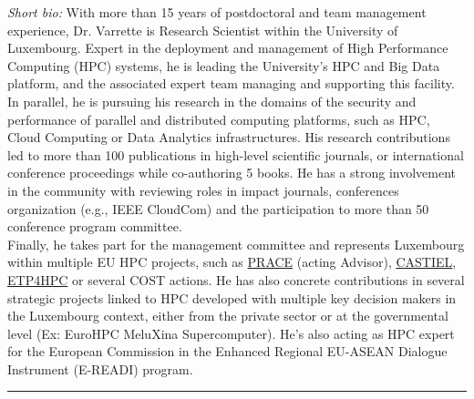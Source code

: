 \documentclass{cv}
\begin{document}
\emph{Short bio:}
With more than 15 years of postdoctoral and team management experience, Dr. Varrette is Research Scientist within the University of Luxembourg.
Expert in the deployment and management of High Performance Computing (HPC) systems, he is leading the University’s HPC and Big Data platform, and the associated expert team managing and supporting this facility.\\
In parallel, he is pursuing his research in the domains of the security and performance of parallel and distributed computing platforms, such as HPC, Cloud Computing or Data Analytics infrastructures.
His research contributions led to more than 100 publications in high-level scientific journals, or international conference proceedings while co-authoring 5 books. He has a strong involvement in the community with reviewing roles in impact journals, conferences organization (e.g., IEEE CloudCom) and the participation to more than 50 conference program committee.\\
Finally, he takes part for the management committee and represents Luxembourg within multiple EU HPC projects, such as \href{http://www.prace-ri.eu/}{PRACE} (acting Advisor), \href{https://www.castiel-project.eu/}{CASTIEL}, \href{http://www.etp4hpc.eu/}{ETP4HPC} or several COST actions. He has also concrete contributions in several strategic projects linked to HPC developed with multiple key decision makers in the Luxembourg context, either from the private sector or at the governmental level (Ex: EuroHPC MeluXina Supercomputer). He's also acting as HPC expert for the European Commission in the Enhanced Regional EU-ASEAN Dialogue Instrument (E-READI) program.


\noindent\rule{\textwidth}{0.4pt}
\end{document}
